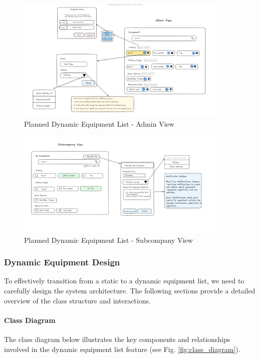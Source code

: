     \begin{figure}[H]
        \centering
        \includegraphics[width=0.9\textwidth]{src/assets/chapters/DynamicEquipementAdmin.PNG}
        \caption{Planned Dynamic Equipment List - Admin View}
        \label{fig:dynamic_equipment_list_admin}
    \end{figure}
    
    \begin{figure}[H]
        \centering
        \includegraphics[width=0.9\textwidth]{src/assets/chapters/DynamicEquipementSubcompany.PNG}
        \caption{Planned Dynamic Equipment List - Subcompany View}
        \label{fig:dynamic_equipment_list_subcompany}
    \end{figure}
    \subsubsection{Dynamic Equipment Design}
To effectively transition from a static to a dynamic equipment list, we need to carefully design the system architecture. The following sections provide a detailed overview of the class structure and interactions.

\paragraph{Class Diagram}
The class diagram below illustrates the key components and relationships involved in the dynamic equipment list feature (see Fig. \ref{fig:class_diagram}).

